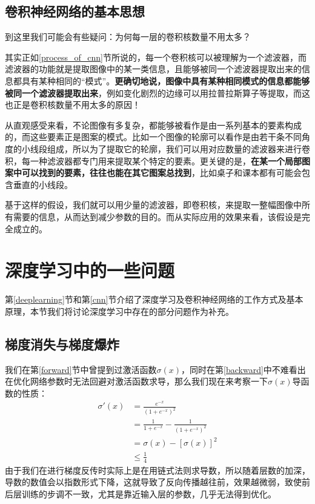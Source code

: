 \documentclass[UTF8]{ctexart}
\begin{document}
        \subsection{卷积神经网络的基本思想}
            
            \indent 到这里我们可能会有些疑问：为何每一层的卷积核数量不用太多？
            
            \indent 其实正如\ref{process_of_cnn}节所说的，每一个卷积核可以被理解为一个滤波器，而滤波器的功能就是提取图像中的某一类信息，且能够被同一个滤波器提取出来的信息都具有某种相同的“模式”。\textbf{更确切地说，图像中具有某种相同模式的信息都能够被同一个滤波器提取出来}，例如变化剧烈的边缘可以用拉普拉斯算子等提取，而这也正是卷积核数量不用太多的原因！
            
            \indent 从直观感受来看，不论图像有多复杂，都能够被看作是由一系列基本的要素构成的，而这些要素正是图案的模式。比如一个图像的轮廓可以看作是由若干条不同角度的小线段组成，所以为了提取它的轮廓，我们可以用对应数量的滤波器来进行卷积，每一种滤波器都专门用来提取某个特定的要素。更关键的是，\textbf{在某一个局部图案中可以找到的要素，往往也能在其它图案总找到}，比如桌子和课本都有可能会包含垂直的小线段。
            
            \indent 基于这样的假设，我们就可以用少量的滤波器，即卷积核，来提取一整幅图像中所有需要的信息，从而达到减少参数的目的。而从实际应用的效果来看，该假设是完全成立的。
    			
    \section{深度学习中的一些问题}
        		\indent 第\ref{deeplearning}节和第\ref{cnn}节介绍了深度学习及卷积神经网络的工作方式及基本原理，本节我们将讨论深度学习中存在的部分问题作为补充。
        		\subsection{梯度消失与梯度爆炸}
        		\indent 我们在第\ref{forward}节中曾提到过激活函数$\sigma(x)$，同时在第\ref{backward}中不难看出在优化网络参数时无法回避对激活函数求导，那么我们现在来考察一下$\sigma(x)$导函数的性质：	
        		\begin{equation}
        		\begin{split}
        		\sigma'(x) &= \frac{e^{-x}}{(1+e^{-x})^2} \\
        		&= \frac{1}{1+e^{-x}} - \frac{1}{(1+e^{-x})^2} \\
        		&= \sigma(x) - [\sigma(x)]^2 \\
        		&\leq \frac{1}{4}
        		\end{split} 
        		\end{equation}		
        		\indent 由于我们在进行梯度反传时实际上是在用链式法则求导数，所以随着层数的加深，导数的数值会以指数形式下降，这就导致了反向传播越往前，效果越微弱，致使前后层训练的步调不一致，尤其是靠近输入层的参数，几乎无法得到优化。
        		
\end{document}
